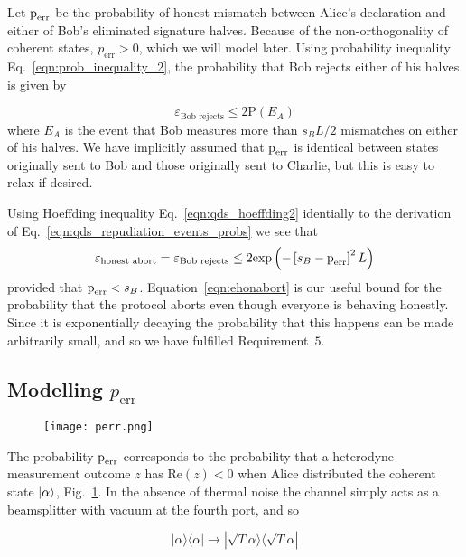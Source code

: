 Let $\text{p}_{\text{err}}$ be the probability of honest mismatch between Alice's declaration and either of Bob's eliminated signature halves. Because of the non-orthogonality of coherent states, $p_{\text{err}} > 0$, which we will model later. Using probability inequality Eq.~\ref{eqn:prob_inequality_2}, the probability that Bob rejects either of his halves is given by

\begin{equation}
\varepsilon_{\text{Bob rejects}} \le 2 \text{P}\left(E_A\right)
\end{equation}
where $E_A$ is the event that Bob measures more than $s_B L/2$ mismatches on either of his halves. We have implicitly assumed that $\text{p}_{\text{err}}$ is identical between states originally sent to Bob and those originally sent to Charlie, but this is easy to relax if desired.

Using Hoeffding inequality Eq.~\ref{eqn:qds_hoeffding2} identially to the derivation of Eq.~\ref{eqn:qds_repudiation_events_probs} we see that
\begin{equation}\label{eqn:ehonabort}
\varepsilon_{\text{honest abort}} = \varepsilon_{\text{Bob rejects}} \le 2 \text{exp}\left( - \left[s_B -\text{p}_{\text{err}}\right]^2 L\right)
\end{equation}
provided that $\text{p}_{\text{err}} < s_B$. Equation~\ref{eqn:ehonabort} is our useful bound for the probability that the protocol aborts even though everyone is behaving honestly. Since it is exponentially decaying the probability that this happens can be made arbitrarily small, and so we have fulfilled Requirement~$5$.

\subsection{Modelling $p_{\text{err}}$}
\begin{figure}[htp]
\centering
\texttt{[image: perr.png]}
\caption{\label{fig:perr}}
\end{figure}

The probability $\text{p}_{\text{err}}$ corresponds to the probability that a heterodyne measurement outcome $z$ has $\text{Re}\left(z\right) < 0$ when Alice distributed the coherent state $\ket{\alpha}$, Fig.~\ref{fig:perr}. In the absence of thermal noise the channel simply acts as a beamsplitter with vacuum at the fourth port, and so

\begin{equation}
|\alpha\rangle\langle\alpha| \rightarrow |\sqrt{T}\alpha\rangle\langle\sqrt{T}\alpha|
\end{equation}


